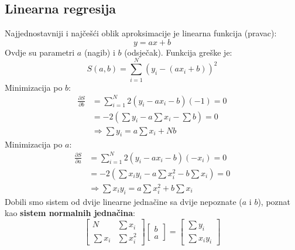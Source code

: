 \documentclass[12pt, a4paper]{article}
\begin{document}
\subsection{Linearna regresija}
Najjednostavniji i najčešći oblik aproksimacije je linearna funkcija (pravac):
\begin{equation}
    y = ax + b
\end{equation}
Ovdje su parametri $a$ (nagib) i $b$ (odsječak). Funkcija greške je:
\begin{equation}
    S(a, b) = \sum_{i=1}^{N} (y_i - (ax_i + b))^2
\end{equation}
Minimizacija po $b$:
\begin{align}
    \frac{\partial S}{\partial b} &= \sum_{i=1}^{N} 2(y_i - ax_i - b)(-1) = 0 \\
    &= -2 \left( \sum y_i - a \sum x_i - \sum b \right) = 0 \\
    &\Rightarrow \sum y_i = a \sum x_i + N b
\end{align}
Minimizacija po $a$:
\begin{align}
    \frac{\partial S}{\partial a} &= \sum_{i=1}^{N} 2(y_i - ax_i - b)(-x_i) = 0 \\
    &= -2 \left( \sum x_i y_i - a \sum x_i^2 - b \sum x_i \right) = 0 \\
    &\Rightarrow \sum x_i y_i = a \sum x_i^2 + b \sum x_i
\end{align}
Dobili smo sistem od dvije linearne jednačine sa dvije nepoznate ($a$ i $b$), poznat kao \textbf{sistem normalnih jednačina}:
\begin{equation}
    \begin{bmatrix}
    N & \sum x_i \\
    \sum x_i & \sum x_i^2
    \end{bmatrix}
    \begin{bmatrix}
    b \\ a
    \end{bmatrix}
    =
    \begin{bmatrix}
    \sum y_i \\
    \sum x_i y_i
    \end{bmatrix}
\end{equation}
\end{document}
